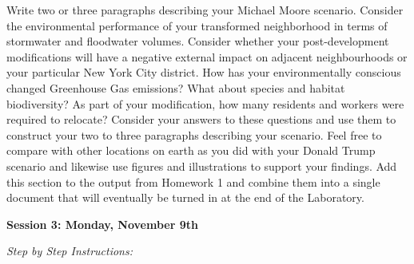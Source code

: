 \documentclass{article}
\begin{document}
\begin{enumerate}[leftmargin=15mm]
Write two or three paragraphs describing your Michael Moore scenario.  Consider the environmental performance of your transformed neighborhood in terms of stormwater and floodwater volumes.  Consider whether your post-development modifications will have a negative external impact on adjacent neighbourhoods or your particular New York City district.  How has your environmentally conscious changed Greenhouse Gas emissions?  What about species and habitat biodiversity?  As part of your modification, how many residents and workers were required to relocate?  Consider your answers to these questions and use them to construct your two to three paragraphs describing your scenario.  Feel free to compare with other locations on earth as you did with your Donald Trump scenario and likewise use figures and illustrations to support your findings.  Add this section to the output from Homework 1 and combine them into a single document that will eventually be turned in at the end of the Laboratory.

\end{enumerate}


\setlength{\leftskip}{0cm}

\large{\textbf{Session 3: Monday, November 9th}}

\vspace{4mm}
\setlength{\leftskip}{1cm}
\textit{Step by Step Instructions:}
\end{document}
